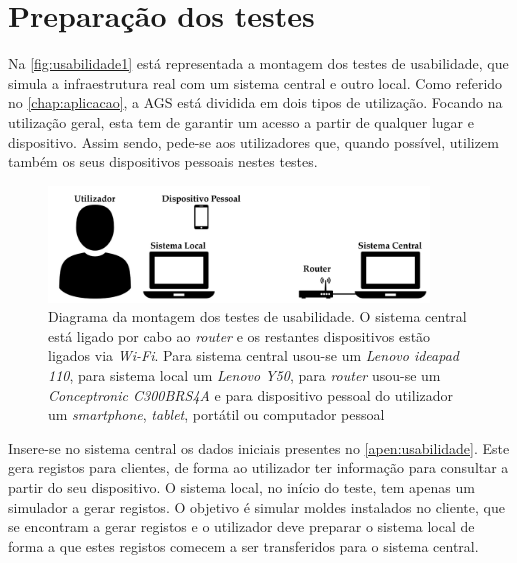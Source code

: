 \documentclass[11pt,twoside,a4paper]{report}
\begin{document}
\section{Preparação dos testes}
Na \autoref{fig:usabilidade1} está representada a montagem dos testes de usabilidade, que simula a infraestrutura real com um sistema central e outro local. Como referido no \autoref{chap:aplicacao}, a AGS está dividida em dois tipos de utilização. Focando na utilização geral, esta tem de garantir um acesso a partir de qualquer lugar e dispositivo. Assim sendo, pede-se aos utilizadores que, quando possível, utilizem também os seus dispositivos pessoais nestes testes.
\begin{figure}[H]
	\vspace{0.5cm}
	\begin{center}
		\includegraphics[width=0.9\textwidth]{montagem_testes} %
		\caption[Diagrama da montagem dos testes de usabilidade]{Diagrama da montagem dos testes de usabilidade. O sistema central está ligado por cabo ao \textit{router} e os restantes dispositivos estão ligados via \textit{Wi-Fi}. Para sistema central usou-se um \textit{Lenovo ideapad 110}, para sistema local um \textit{Lenovo Y50}, para \textit{router} usou-se um \textit{Conceptronic C300BRS4A} e para dispositivo pessoal do utilizador um \textit{smartphone}, \textit{tablet}, portátil ou computador pessoal}
		\label{fig:usabilidade1}
	\end{center}
\end{figure}
Insere-se no sistema central os dados iniciais presentes no \autoref{apen:usabilidade}. Este gera registos para clientes, de forma ao utilizador ter informação para consultar a partir do seu dispositivo. O sistema local, no início do teste, tem apenas um simulador a gerar registos. O objetivo é simular moldes instalados no cliente, que se encontram a gerar registos e o utilizador deve preparar o sistema local de forma a que estes registos comecem a ser transferidos para o sistema central.
\end{document}
